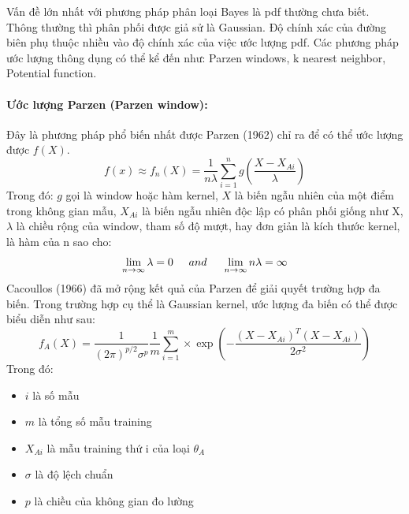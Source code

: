 Vấn đề lớn nhất với phương pháp phân loại Bayes là \ac{pdf} thường chưa biết. Thông thường thì phân phối được giả sử là Gaussian. Độ chính xác của đường biên phụ thuộc nhiều vào độ chính xác của việc ước lượng \ac{pdf}. Các phương pháp ước lượng thông dụng có thể kể đến như: Parzen windows, k nearest neighbor, Potential function. \cite{PNN_chapter}
\paragraph{Ước lượng Parzen (Parzen window):} \cite{Implementing-PNN}
Đây là phương pháp phổ biến nhất được Parzen (1962) chỉ ra để có thể ước lượng được $f(X)$.
\begin{equation}
f(x) \approx f_n(X) = \frac{1}{n\lambda} \sum_{i=1}^n g(\frac{X - X_{Ai}}{\lambda})
\end{equation}
Trong đó: $g$ gọi là window hoặc hàm kernel, $X$ là biến ngẫu nhiên của một điểm trong không gian mẫu, $X_{Ai}$ là biến ngẫu nhiên độc lập có phân phối giống như X,  $\lambda$ là chiều rộng của window, tham số độ mượt, hay đơn giản là kích thước kernel,  là hàm của n sao cho:
\begin{equation}
\lim_{n\to\infty} \lambda = 0 \hspace{0.5 cm} and  \hspace{0.5 cm} \lim_{n\to\infty} n\lambda = \infty
\end{equation}
Cacoullos (1966) đã mở rộng kết quả của Parzen để giải quyết trường hợp đa biến. Trong trường hợp cụ thể là Gaussian kernel, ước lượng đa biến có thể được biểu diễn như sau: \cite{PNN-original}
\begin{equation}
f_A(X) = \frac {1}{(2\pi)^{p/2}\sigma^p} \frac{1}{m} \sum ^m _{i=1} \times \exp (-\frac{(X-X_{Ai})^T(X-X_{Ai})}{2\sigma^2})
\label{eqn:cacoullos}
\end{equation}
 Trong đó:
 \begin{itemize}
	 \item $i$ là số mẫu
	 \item $m$ là tổng số mẫu training
	 \item $X_{Ai}$ là mẫu training thứ i của loại $\theta_A$
	 \item $\sigma$ là độ lệch chuẩn
	 \item $p$ là chiều của không gian đo lường
 \end{itemize}
